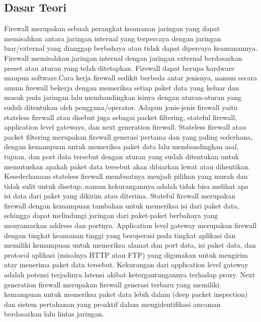 \subsection{Dasar Teori}
Firewall merupakan sebuah perangkat keamanan jaringan yang dapat memisahkan antara jaringan internal yang terpercaya dengan jaringan luar/external yang dianggap berbahaya atau tidak dapat dipercaya keamanannya. Firewall memisahkan jaringan internal dengan jaringan external berdasarkan preset atau aturan yang telah ditetapkan. Firewall dapat berupa hardware maupun software.Cara kerja firewall sedikit berbeda antar jenisnya, namun secara umum firewall bekerja dengan memeriksa setiap paket data yang keluar dan masuk pada jaringan lalu membandingkan isinya dengan aturan-aturan yang sudah ditentukan oleh pengguna/operator. Adapun jenis-jenis firewall yaitu stateless firewall atau disebut juga sebagai packet filtering, stateful firewall, application level gateways, dan next generation firewall. Stateless firewall atau packet filtering merupakan firewall generasi pertama dan yang paling sederhana, dengan kemampuan untuk memeriksa paket data lalu membandingkan asal, tujuan, dan port data tersebut dengan aturan yang sudah ditentukan untuk memutuskan apakah paket data tersebut akan dibiarkan lewat atau dihentikan. Kesederhanaan stateless firewall membuatnya menjadi pilihan yang murah dan tidak sulit untuk disetup, namun kekurangannya adalah tidak bisa melihat apa isi data dari paket yang dikirim atau diterima. Stateful firewall merupakan firewall dengan kemampuan tambahan untuk memeriksa isi dari paket data, sehingga dapat melindungi jaringan dari paket-paket berbahaya yang menyamarkan address dan portnya. Application level gateway merupakan firewall dengan tingkat keamanan tinggi yang beroperasi pada tingkat aplikasi dan memiliki kemampuan untuk memeriksa alamat dan port data, isi paket data, dan protocol aplikasi (misalnya HTTP atau FTP) yang digunakan untuk mengirim atay menerima paket data tersebut. Kekurangan dari application level gateway adalah potensi terjadinya latensi akibat ketergantungannya terhadap proxy. Next generation firewall merupakan firewall generasi terbaru yang memiliki kemampuan untuk memeriksa paket data lebih dalam (deep packet inspection) dan sistem pertahanan yang proaktif dalam mengidentifikasi ancaman berdasarkan lalu lintas jaringan. 

